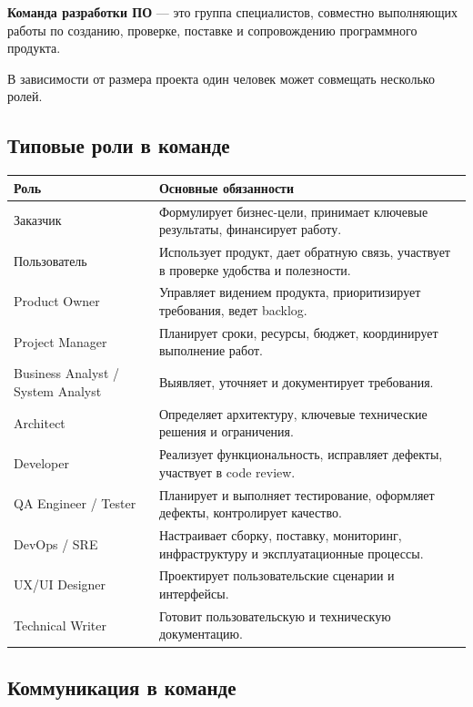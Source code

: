 \documentclass[12pt,a4paper]{article}
\begin{document}
\textbf{Команда разработки ПО} --- это группа специалистов, совместно выполняющих работы по созданию, проверке, поставке и сопровождению программного продукта.

В зависимости от размера проекта один человек может совмещать несколько ролей.

\subsection{Типовые роли в команде}

\begin{center}
\begin{tabular}{p{} p{}}
\toprule
\textbf{Роль} & \textbf{Основные обязанности} \\
\midrule
Заказчик & Формулирует бизнес-цели, принимает ключевые результаты, финансирует работу. \\
Пользователь & Использует продукт, дает обратную связь, участвует в проверке удобства и полезности. \\
Product Owner & Управляет видением продукта, приоритизирует требования, ведет backlog. \\
Project Manager & Планирует сроки, ресурсы, бюджет, координирует выполнение работ. \\
Business Analyst / System Analyst & Выявляет, уточняет и документирует требования. \\
Architect & Определяет архитектуру, ключевые технические решения и ограничения. \\
Developer & Реализует функциональность, исправляет дефекты, участвует в code review. \\
QA Engineer / Tester & Планирует и выполняет тестирование, оформляет дефекты, контролирует качество. \\
DevOps / SRE & Настраивает сборку, поставку, мониторинг, инфраструктуру и эксплуатационные процессы. \\
UX/UI Designer & Проектирует пользовательские сценарии и интерфейсы. \\
Technical Writer & Готовит пользовательскую и техническую документацию. \\
\bottomrule
\end{tabular}
\end{center}

\subsection{Коммуникация в команде}
\end{document}
